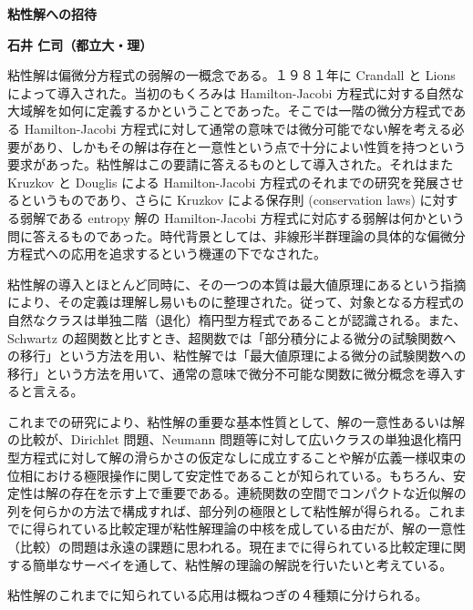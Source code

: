 \documentclass[uplatex,dvipdfmx]{jlreq}
\begin{document}

\begin{center}
{\large\bfseries 粘性解への招待}
\end{center}

\begin{flushright}
\textbf{石井 仁司（都立大・理）}
\end{flushright}

粘性解は偏微分方程式の弱解の一概念である。１９８１年に Crandall と Lions によって導入された。当初のもくろみは Hamilton-Jacobi 方程式に対する自然な大域解を如何に定義するかということであった。そこでは一階の微分方程式である Hamilton-Jacobi 方程式に対して通常の意味では微分可能でない解を考える必要があり、しかもその解は存在と一意性という点で十分によい性質を持つという要求があった。粘性解はこの要請に答えるものとして導入された。それはまた Kruzkov と Douglis による Hamilton-Jacobi 方程式のそれまでの研究を発展させるというものであり、さらに Kruzkov による保存則 (conservation laws) に対する弱解である entropy 解の Hamilton-Jacobi 方程式に対応する弱解は何かという問に答えるものであった。時代背景としては、非線形半群理論の具体的な偏微分方程式への応用を追求するという機運の下でなされた。

粘性解の導入とほとんど同時に、その一つの本質は最大値原理にあるという指摘により、その定義は理解し易いものに整理された。従って、対象となる方程式の自然なクラスは単独二階（退化）楕円型方程式であることが認識される。また、Schwartz の超関数と比すとき、超関数では「部分積分による微分の試験関数への移行」という方法を用い、粘性解では「最大値原理による微分の試験関数への移行」という方法を用いて、通常の意味で微分不可能な関数に微分概念を導入すると言える。

これまでの研究により、粘性解の重要な基本性質として、解の一意性あるいは解の比較が、Dirichlet 問題、Neumann 問題等に対して広いクラスの単独退化楕円型方程式に対して解の滑らかさの仮定なしに成立することや解が広義一様収束の位相における極限操作に関して安定性であることが知られている。もちろん、安定性は解の存在を示す上で重要である。連続関数の空間でコンパクトな近似解の列を何らかの方法で構成すれば、部分列の極限として粘性解が得られる。これまでに得られている比較定理が粘性解理論の中核を成している由だが、解の一意性（比較）の問題は永遠の課題に思われる。現在までに得られている比較定理に関する簡単なサーベイを通して、粘性解の理論の解説を行いたいと考えている。

粘性解のこれまでに知られている応用は概ねつぎの４種類に分けられる。
\end{document}
